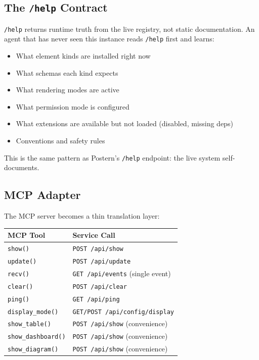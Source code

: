 \documentclass[a4paper,10pt]{article}
\newcommand{\api}[1]{\texttt{#1}}
\begin{document}
\subsection{The \api{/help} Contract}

\api{/help} returns runtime truth from the live registry, not
static documentation.  An agent that has never seen this
instance reads \api{/help} first and learns:

\begin{itemize}[nosep]
  \item What element kinds are installed right now
  \item What schemas each kind expects
  \item What rendering modes are active
  \item What permission mode is configured
  \item What extensions are available but not loaded (disabled,
    missing deps)
  \item Conventions and safety rules
\end{itemize}

This is the same pattern as Postern's \api{/help} endpoint:
the live system self-documents.

\subsection{MCP Adapter}

The MCP server becomes a thin translation layer:

\begin{center}
\begin{tabular}{@{}ll@{}}
\toprule
\textbf{MCP Tool} & \textbf{Service Call} \\
\midrule
\texttt{show()}          & \api{POST /api/show} \\
\texttt{update()}        & \api{POST /api/update} \\
\texttt{recv()}          & \api{GET /api/events} (single event) \\
\texttt{clear()}         & \api{POST /api/clear} \\
\texttt{ping()}          & \api{GET /api/ping} \\
\texttt{display\_mode()} & \api{GET/POST /api/config/display} \\
\texttt{show\_table()}   & \api{POST /api/show} (convenience) \\
\texttt{show\_dashboard()} & \api{POST /api/show} (convenience) \\
\texttt{show\_diagram()} & \api{POST /api/show} (convenience) \\
\bottomrule
\end{tabular}
\end{center}
\end{document}
